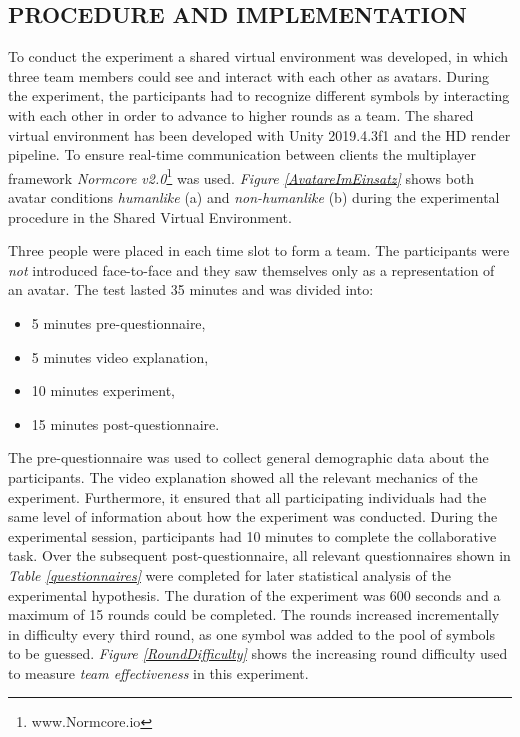 \documentclass[sigchi]{acmart}
\begin{document}
\subsection{PROCEDURE AND IMPLEMENTATION}
To conduct the experiment a shared virtual environment was developed, in which three team members could see and interact with each other as avatars. During the experiment, the participants had to recognize different symbols by interacting with each other in order to advance to higher rounds as a team. The shared virtual environment has been developed with Unity 2019.4.3f1 and the HD render pipeline. To ensure real-time communication between clients the multiplayer framework \textit{Normcore v2.0}\footnote{www.Normcore.io} was used.
\textit{Figure \ref{AvatareImEinsatz}} shows both avatar conditions \textit{humanlike} (a) and \textit{non-humanlike} (b) during the experimental procedure in the Shared Virtual Environment.

Three people were placed in each time slot to form a team. The participants were \textit{not} introduced face-to-face and they saw themselves only as a representation of an avatar.
The test lasted 35 minutes and was divided into:
		\begin{itemize}
			\item 5 minutes pre-questionnaire,
			\item 5 minutes video explanation,
			\item 10 minutes experiment,
			\item 15 minutes post-questionnaire.
		\end{itemize}
The pre-questionnaire was used to collect general demographic data about the participants. The video explanation showed all the relevant mechanics of the experiment. Furthermore, it ensured that all participating individuals had the same level of information about how the experiment was conducted. During the experimental session, participants had 10 minutes to complete the collaborative task. Over the subsequent post-questionnaire, all relevant questionnaires shown in \textit{Table \ref{questionnaires}} were completed for later statistical analysis of the experimental hypothesis. The duration of the experiment was 600 seconds and a maximum of 15 rounds could be completed. The rounds increased incrementally in difficulty every third round, as one symbol was added to the pool of symbols to be guessed.
\textit{Figure \ref{RoundDifficulty}} shows the increasing round difficulty used to measure \textit{team effectiveness} in this experiment.
\end{document}
